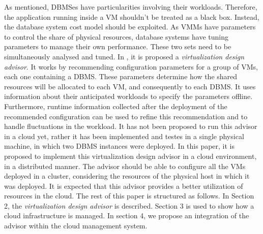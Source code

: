 As mentioned, DBMSes have particularities involving their workloads. Therefore, the application running inside a VM shouldn't be treated as a black box. Instead, the database system cost model should be exploited. As VMMs have parameters to control the share of physical resources, database systems have tuning parameters to manage their own performance. These two sets need to be simultaneously analysed and tuned. In \cite{Soror:2008:AVM:1376616.1376711}, it is proposed a \textit{virtualization design advisor}. It works by recommending configuration parameters for a group of VMs, each one containing a DBMS. These parameters determine how the shared resources will be allocated to each VM, and consequently to each DBMS. It uses information about their anticipated workloads to specify the parameters offline. Furthermore, runtime information collected after the deployment of the recommended configuration can be used to refine this recommendation and to handle fluctuations in the workload. It has not been proposed to run this advisor in a cloud yet, rather it has been implemented and testes in a single physical machine, in which two DBMS instances were deployed.
In this paper, it is proposed to implement this virtualization design advisor in a cloud environment, in a distributed manner. The advisor should be able to configure all the VMs deployed in a cluster, considering the resources of the physical host in which it was deployed. It is expected that this advisor provides a better utilization of resources in the cloud. The rest of this paper is structured as follows. In Section 2, the \textit{virtualization design advisor} is described. Section 3 is used to show how a cloud infrastructure is managed. In section 4, we propose an integration of the advisor within the cloud management system.

